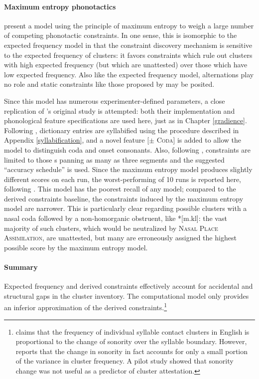 \paragraph{Maximum entropy phonotactics}
\citet{Hayes2008a} present a model using the principle of maximum entropy to weigh a large number of competing phonotactic constraints.
In one sense, this is isomorphic to the expected frequency model in that the constraint discovery mechanism is sensitive to the expected frequency of clusters: it favors constraints which rule out clusters with high expected frequency (but which are unattested) over those which have low expected frequency.
Also like the expected frequency model, alternations play no role and static constraints like those proposed by \citet{Pierrehumbert1994} may be posited.

Since this model has numerous experimenter-defined parameters, a close replication of \citeauthor{Hayes2008a}'s original study is attempted: both their implementation and phonological feature specifications are used here, just as in Chapter \ref{gradience}.
Following \citet{HayesInPress}, dictionary entries are syllabified using the procedure described in Appendix \ref{syllabification}, and a novel feature [$\pm$ \textsc{Coda}] is added to allow the model to distinguish coda and onset consonants.
Also, following \citeauthor{Hayes2008a}, constraints are limited to those s
panning as many as three segments and the suggested ``accuracy schedule'' is used.
Since the maximum entropy model produces slightly different scores on each run, the worst-performing of 10 runs is reported here, following \citeauthor{Hayes2008a}.
This model has the poorest recall of any model; compared to the derived constraints baseline, the constraints induced by the maximum entropy model are narrower.
This is particularly clear regarding possible clusters with a nasal coda followed by a non-homorganic obstruent, like *[m.kl]: the vast majority of such clusters, which would be neutralized by \textsc{Nasal Place Assimilation}, are unattested, but many are erroneously assigned the highest possible score by the maximum entropy model.

\paragraph{Summary}
Expected frequency and derived constraints effectively account for accidental and structural gaps in the cluster inventory.
The \citet{Hayes2008a} computational model only provides an inferior approximation of the derived constraints.\footnote{
    \citet{McGowan2009} claims that the frequency of individual syllable contact clusters in English is proportional to the change of sonority over the syllable boundary.
    However, \citeauthor{McGowan2009} reports that the change in sonority in fact accounts for only a small portion of the variance in cluster frequency.
    A pilot study showed that sonority change was not useful as a predictor of cluster attestation.}

